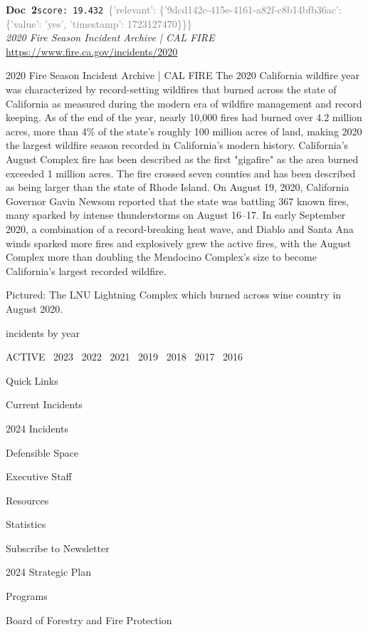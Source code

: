 \documentclass[a4paper,11pt]{article}
\begin{document}
\begin{docenv}
{\footnotesize\textcolor{doccolor}{\textbf{Doc~2}}}\hfill{\tiny\texttt{score:~19.432}}\ {\tiny\textcolor{gray}{\{'relevant': \{'9dcd142c-415e-4161-a82f-c8b14bfb36ac': \{'value': 'yes', 'timestamp': 1723127470\}\}\}}}\\[3pt]
{\small\textit{2020 Fire Season Incident Archive | CAL FIRE}}\\[2pt]
{\tiny\url{https://www.fire.ca.gov/incidents/2020}}\\[4pt]
{\footnotesize 2020 Fire Season Incident Archive | CAL FIRE
The 2020 California wildfire year was characterized by record-setting wildfires that burned across the state of California as measured during the modern era of wildfire management and record keeping. As of the end of the year, nearly 10,000 fires had burned over 4.2 million acres, more than 4\% of the state's roughly 100 million acres of land, making 2020 the largest wildfire season recorded in California's modern history. California's August Complex fire has been described as the first "gigafire" as the area burned exceeded 1 million acres. The fire crossed seven counties and has been described as being larger than the state of Rhode Island. On August 19, 2020, California Governor Gavin Newsom reported that the state was battling 367 known fires, many sparked by intense thunderstorms on August 16–17. In early September 2020, a combination of a record-breaking heat wave, and Diablo and Santa Ana winds sparked more fires and explosively grew the active fires, with the August Complex more than doubling the Mendocino Complex's size to become California's largest recorded wildfire.

Pictured: The LNU Lightning Complex which burned across wine country in August 2020.

incidents by year

ACTIVE 
2023 
2022 
2021 
2019 
2018 
2017 
2016 

Quick Links

Current Incidents

2024 Incidents

Defensible Space

Executive Staff

Resources

Statistics

Subscribe to Newsletter

2024 Strategic Plan

Programs

Board of Forestry and Fire Protection

}
\end{docenv}
\end{document}
